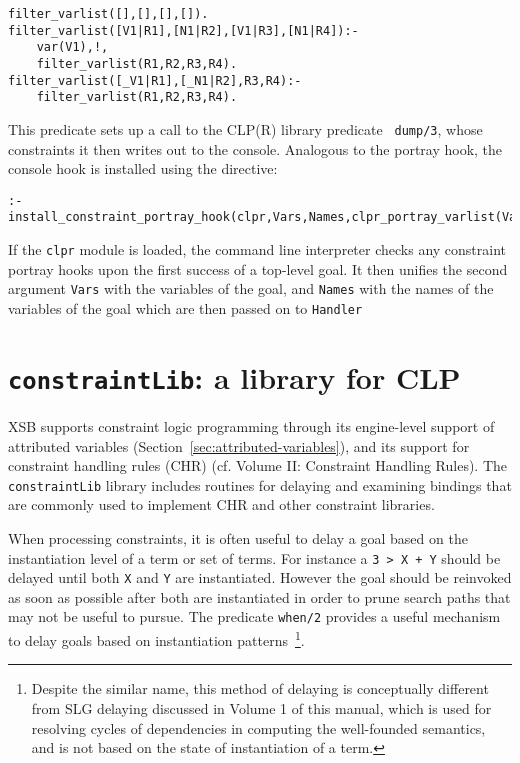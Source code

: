 \begin{description}
{\begin{verbatim}
filter_varlist([],[],[],[]).
filter_varlist([V1|R1],[N1|R2],[V1|R3],[N1|R4]):- 
	var(V1),!,
	filter_varlist(R1,R2,R3,R4).
filter_varlist([_V1|R1],[_N1|R2],R3,R4):- 
	filter_varlist(R1,R2,R3,R4).
\end{verbatim}
}
%
This predicate sets up a call to the CLP(R) library predicate {\tt
  dump/3}, whose constraints it then writes out to the console.
Analogous to the portray hook, the console hook is installed using the
directive:
%
{\small
\begin{verbatim}
:- install_constraint_portray_hook(clpr,Vars,Names,clpr_portray_varlist(Vars,Names)).
\end{verbatim}
}
%
If the {\tt clpr} module is loaded, the command line interpreter
checks any constraint portray hooks upon the first success of a
top-level goal.  It then unifies the second argument {\tt Vars} with
the variables of the goal, and {\tt Names} with the names of the
variables of the goal which are then passed on to {\tt Handler}

\end{description}

\section{{\tt constraintLib}: a library for CLP} \label{constraintLib}

XSB supports constraint logic programming through its engine-level
support of attributed variables
(Section~\ref{sec:attributed-variables}), and its support for
constraint handling rules (CHR) (cf. Volume II: Constraint Handling
Rules).  The {\tt constraintLib} library includes routines for
delaying and examining bindings that are commonly used to implement
CHR and other constraint libraries.

When processing constraints, it is often useful to delay a goal based
on the instantiation level of a term or set of terms.  For instance a
{\tt 3 > X + Y} should be delayed until both {\tt X} and {\tt Y} are
instantiated.  However the goal should be reinvoked as soon as
possible after both are instantiated in order to prune search paths
that may not be useful to pursue.  The predicate {\tt when/2} provides
a useful mechanism to delay goals based on instantiation
patterns~\footnote{Despite the similar name, this method of delaying
is conceptually different from SLG {\sc delaying} discussed in Volume
1 of this manual, which is used for resolving cycles of dependencies
in computing the well-founded semantics, and is not based on the state
of instantiation of a term.}.

